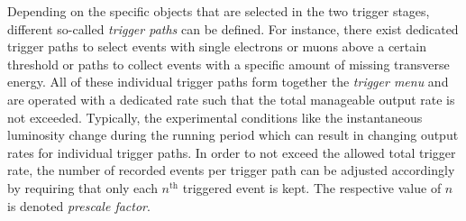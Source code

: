 Depending on the specific objects that are selected in the two trigger stages, different so-called \textit{trigger paths} can be defined. For instance, there exist dedicated trigger paths to select events with single electrons or muons above a certain \pt threshold or paths to collect events with a specific amount of missing transverse energy. All of these individual trigger paths form together the \textit{trigger menu} and are operated with a dedicated rate such that the total manageable output rate is not exceeded. Typically, the experimental conditions like the instantaneous luminosity change during the running period which can result in changing output rates for individual trigger paths. In order to not exceed the allowed total trigger rate, the number of recorded events per trigger path can be adjusted accordingly by requiring that only each $n^\mathrm{th}$ triggered event is kept. The respective value of $n$ is denoted \textit{prescale factor}. 


